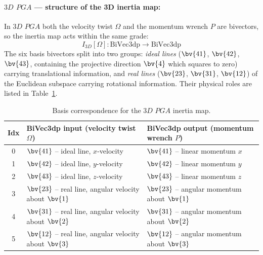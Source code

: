 \paragraph{$3D$ $PGA$ --- structure of the 3D inertia map:}
In $3D$ $PGA$ both the velocity twist $\Omega$ and the momentum wrench $P$ are bivectors,
so the inertia map acts within the same grade:
\begin{equation}
    I_{3D}[\Omega] : \mathrm{BiVec3dp} \to \mathrm{BiVec3dp}
\end{equation}
The six basis bivectors split into two groups: \emph{ideal lines} ($\bv{41}$, $\bv{42}$,
$\bv{43}$, containing the projective direction $\bv{4}$ which squares to zero) carrying
translational information, and \emph{real lines} ($\bv{23}$, $\bv{31}$, $\bv{12}$) of the
Euclidean subspace carrying rotational information. Their physical roles are listed in
Table~\ref{tab:basis_pga3dp}.

\begin{table}[h!]
\centering\small
\begin{tabular}{c|p{5.7cm}|p{5.7cm}}
\hline
Idx & BiVec3dp input (velocity twist $\Omega$) & BiVec3dp output (momentum wrench $P$) \\
\hline
0 & $\bv{41}$ -- ideal line, $x$-velocity &
$\bv{41}$ -- linear momentum $x$
\\
1 & $\bv{42}$ -- ideal line, $y$-velocity &
$\bv{42}$ -- linear momentum $y$
\\
2 & $\bv{43}$ -- ideal line, $z$-velocity &
$\bv{43}$ -- linear momentum $z$
\\
3 & $\bv{23}$ -- real line, angular velocity about $\bv{1}$ &
$\bv{23}$ -- angular momentum about $\bv{1}$
\\
4 & $\bv{31}$ -- real line, angular velocity about $\bv{2}$ &
$\bv{31}$ -- angular momentum about $\bv{2}$
\\
5 & $\bv{12}$ -- real line, angular velocity about $\bv{3}$ &
$\bv{12}$ -- angular momentum about $\bv{3}$
\\
\hline
\end{tabular}
\caption{Basis correspondence for the $3D$ $PGA$ inertia map.}
\label{tab:basis_pga3dp}
\end{table}

